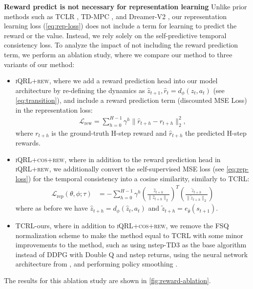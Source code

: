 \documentclass{article}
\theoremstyle{plain}
\theoremstyle{definition}
\theoremstyle{remark}
\newcommand{\ourrew}{\textsc{iQRL+rew}\xspace}
\newcommand{\ourcosrew}{\textsc{iQRL+cos+rew}\xspace}
\begin{document}
\textbf{Reward predict is not necessary for representation learning}
Unlike prior methods such as TCLR \cite{zhaoSimplifiedTemporalConsistency2023}, TD-MPC \cite{hansenTemporalDifferenceLearning2022}, and Dreamer-V2 \cite{hafnerMasteringAtariDiscrete2022}, our representation learning loss (\cref{eq:rep-loss}) does not include a term for learning to predict the reward or the value. Instead, we rely solely on the self-predictive temporal consistency loss. To analyze the impact of not including the reward prediction term, we perform an ablation study, where we compare our method to three variants of our method:
\begin{itemize}
	\item \ourrew, where we add a reward prediction head into our model architecture by re-defining the dynamics as $\hat{z}_{t+1}, \hat{r}_t = d_{\phi} (z_{t}, a_{t})$ (see \cref{eq:transition}), and include a reward prediction term (discounted MSE Loss) in the representation loss:
	\begin{align*}
		\mathcal{L}_\text{rew} = \sum_{h=0}^{H-1} \gamma^h \| \hat{r}_{t+h} - r_{t+h}\|_2^2,
	\end{align*}
	where $r_{t+h}$ is the ground-truth H-step reward and $\hat{r}_{t+h}$ the predicted H-step rewards.
	\item \ourcosrew, where in addition to the reward prediction head in \ourrew, we additionally convert the self-supervised MSE loss (see \cref{eq:rep-loss}) for the temporal consistency into a cosine similarity, similarly to TCRL:
	\begin{align*} \label{eq:rep-loss}
		\mathcal{L}_{\text{rep}}(\theta, \phi; \tau)
		&= - \sum_{h=0}^{H-1} \gamma^{h} \left ( \frac{\hat{z}_{t+h}}{\| \hat{z}_{t+h} \|_2} \right )^T \left ( \frac{\tilde{z}_{t+h}}{\| \tilde{z}_{t+h} \|_2} \right )
	\end{align*}
  where as before we have $\hat{z}_{t+h} = d_{\phi}(\hat{z}_{t}, a_{t})$ and $\tilde{z}_{t+h} = e_{\bar{\theta}}(s_{t+1})$.
	\item TCRL-ours, where in addition to \ourcosrew, we remove the FSQ normalization scheme to make the method equal to TCRL with some minor improvements to the method, such as using nstep-TD3 \cite{fujimotoAddressingFunctionApproximation2018} as the base algorithm instead of DDPG with Double Q and nstep returns, using the neural network architecture from \citet{hansen2023td}, and performing policy smoothing \cite{fujimotoAddressingFunctionApproximation2018}.
\end{itemize}
The results for this ablation study are shown in \cref{fig:reward-ablation}. 
\end{document}
